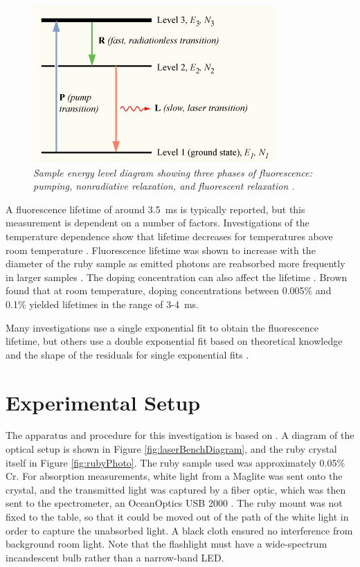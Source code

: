 \documentclass[11pt, a4paper, twocolumn]{article}
\begin{document}
\begin{figure}
\includegraphics[width=\linewidth]{Population-inversion-3level.png}
\caption{\textit{Sample energy level diagram showing three phases of fluorescence: pumping, nonradiative relaxation, and fluorescent relaxation \cite{3levelDiagram}.}}
\label{fig:Population-inversion-3level}
\end{figure}

A fluorescence lifetime of around \SI{3.5}{\ms} is typically reported, but this measurement is dependent on a number of factors. Investigations of the temperature dependence show that lifetime decreases for temperatures above room temperature \cite{Seat, Nelson}. Fluorescence lifetime was shown to increase with the diameter of the ruby sample as emitted photons are reabsorbed more frequently in larger samples \cite{Jones}. The doping concentration can also affect the lifetime \cite{Brown}. Brown found that at room temperature, doping concentrations between 0.005\% and 0.1\% yielded lifetimes in the range of 3-\SI{4}{\ms}.

Many investigations use a single exponential fit to obtain the fluorescence lifetime, but others use a double exponential fit based on theoretical knowledge and the shape of the residuals for single exponential fits \cite{McBane, Jones}. 

\section*{Experimental Setup}

The apparatus and procedure for this investigation is based on \cite{Heiman}. A diagram of the optical setup is shown in Figure \ref{fig:laserBenchDiagram}, and the ruby crystal itself in Figure \ref{fig:rubyPhoto}. The ruby sample used was approximately 0.05\% Cr. For absorption measurements, white light from a Maglite was sent onto the crystal, and the transmitted light was captured by a fiber optic, which was then sent to the spectrometer, an OceanOptics USB 2000 \cite{SpectrometerData}. The ruby mount was not fixed to the table, so that it could be moved out of the path of the white light in order to capture the unabsorbed light. A black cloth ensured no interference from background room light. Note that the flashlight must have a wide-spectrum incandescent bulb rather than a narrow-band LED.
\end{document}
